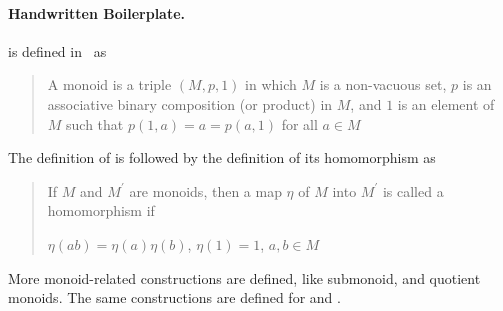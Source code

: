 \paragraph{Handwritten Boilerplate.}
 is defined in~\cite{jacobson1985basic} as
\begin{quote}
    A monoid is a triple $(M,p,1)$ in which $M$ is a non-vacuous set, $p$ is an associative binary composition (or product) in $M$, and $1$ is an element of $M$ such that $p(1,a)= a = p(a,1)$ for all $a \in M$ 
\end{quote}
The definition of  is followed by the definition of its homomorphism as
\begin{quote}
If $M$ and $M^\prime$ are monoids, then a map $\eta$ of $M$ into $M^\prime$ is called a homomorphism if 
\begin{multicols}{3}
    $\eta(ab)=\eta(a)\eta(b)$, \vfill   
    \columnbreak
    $\eta(1) = 1$, \vfill   
    \columnbreak 
    $a,b \in M$  \vfill    
\end{multicols}
\end{quote}
More monoid-related constructions are defined, like submonoid, and quotient monoids. The same constructions are defined for  and . 

